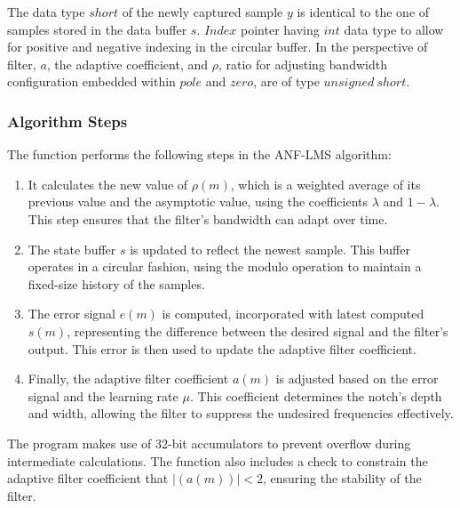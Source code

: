The data type $short$ of the newly captured sample $y$ is identical to the one of samples stored in the data buffer $s$. $Index$ pointer having $int$ data type to allow for positive and negative indexing in the circular buffer. In the perspective of filter, $a$, the adaptive coefficient, and $\rho$, ratio for adjusting bandwidth configuration embedded within $pole$ and $zero$, are of type $unsigned\ short$.  

\subsubsection{Algorithm Steps}
The function performs the following steps in the ANF-LMS algorithm:

\begin{enumerate}
    \item It calculates the new value of $\rho(m)$, which is a weighted average of its previous value and the asymptotic value, using the coefficients $\lambda$ and $1 - \lambda$. This step ensures that the filter's bandwidth can adapt over time.
    
    \item The state buffer $s$ is updated to reflect the newest sample. This buffer operates in a circular fashion, using the modulo operation to maintain a fixed-size history of the samples.
    
    \item The error signal $e(m)$ is computed, incorporated with latest computed $s(m)$, representing the difference between the desired signal and the filter's output. This error is then used to update the adaptive filter coefficient.
    
    \item Finally, the adaptive filter coefficient $a(m)$ is adjusted based on the error signal and the learning rate $\mu$. This coefficient determines the notch's depth and width, allowing the filter to suppress the undesired frequencies effectively.
\end{enumerate}

The program makes use of 32-bit accumulators to prevent overflow during intermediate calculations. The function also includes a check to constrain the adaptive filter coefficient that $\left\lvert (a(m)) \right\rvert < 2 $, ensuring the stability of the filter.

